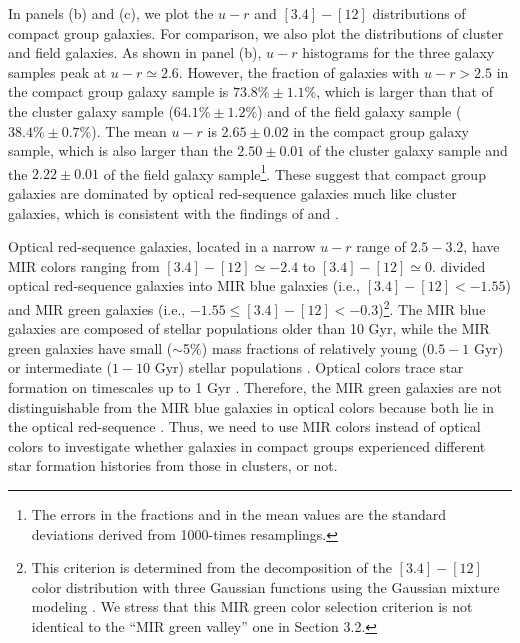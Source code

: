 \documentclass[12pt,preprint,apj]{emulateapj}
\begin{document}
In panels (b) and (c), we plot the $u-r$ and $[3.4]-[12]$ distributions 
of compact group galaxies.
For comparison, we also plot the distributions of cluster and field galaxies.
As shown in panel (b), 
$u-r$ histograms for the three galaxy samples peak at $u-r\simeq2.6$. 
However, 
the fraction of galaxies with $u-r>2.5$ in the compact group galaxy sample is 
$73.8\%\pm1.1\%$, which is larger than that of the cluster galaxy sample 
($64.1\%\pm1.2\%$) and of the field galaxy sample ($38.4\%\pm0.7\%$).
The mean $u-r$ is $2.65\pm0.02$ in the compact group galaxy sample, 
which is also larger  than the $2.50\pm0.01$ of the cluster galaxy sample 
and the $2.22\pm0.01$ of the field galaxy sample\footnote{
The errors in the fractions and in the mean values are the standard deviations 
derived from 1000-times resamplings.}.
These suggest that compact group galaxies are dominated by optical 
red-sequence galaxies much like cluster galaxies, which is consistent with 
the findings of \citet{walker+13} and \citet{zucker+16}. 

Optical red-sequence galaxies, located in a narrow $u-r$ range of $2.5-3.2$,
have MIR colors ranging from $[3.4]-[12]\simeq-2.4$ to $[3.4]-[12]\simeq0$. 
\citet{lee+15} divided optical red-sequence galaxies into MIR blue galaxies 
(i.e., $[3.4]-[12]<-1.55$) and MIR green galaxies (i.e., $-1.55\leq[3.4]-[12]<-0.3$)\footnote{This criterion is determined from the decomposition 
of the $[3.4]-[12]$ color distribution with three Gaussian functions 
using the Gaussian mixture modeling 
\citep[][see Figure 2 in \citealt{lee+15}]{muratov+10}. 
We stress that this MIR green color selection criterion 
is not identical to the ``MIR green valley'' one in Section 3.2.}. 
The MIR blue galaxies are composed of stellar populations older than 10 Gyr, 
while the MIR green galaxies have small ($\sim$5\%) mass fractions of 
relatively young ($0.5-1$ Gyr) or intermediate ($1-10$ Gyr) stellar populations 
\citep{piovan+03,ko+13,lee+15,ko+16}. Optical colors trace star formation on 
timescales up to 1 Gyr \citep{schawinski+14}. Therefore, the MIR green  
galaxies are not distinguishable from the MIR blue galaxies in optical colors
because both lie in the optical red-sequence \citep{walker+12,walker+13,ko+13,lee+15,zucker+16}. Thus, we need to use MIR colors instead of optical colors 
to investigate whether galaxies in compact groups experienced 
different star formation histories from those in clusters, or not.
\end{document}
